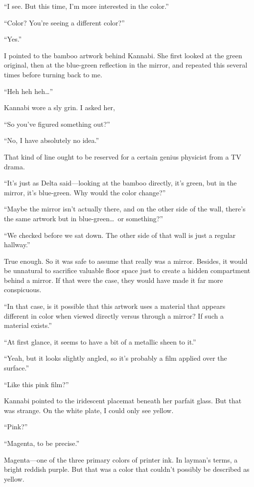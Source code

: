 \documentclass[
    a4paper,
    12pt,
    twoside,
    openany,
    UTF8,
    fontset=windows
]{ctexbook}
\begin{document}
``I see. But this time, I'm more interested in the color.''

``Color? You're seeing a different color?''

``Yes.''

I pointed to the bamboo artwork behind Kannabi. She first looked at the green original, then at the blue-green reflection in the mirror, and repeated this several times before turning back to me.

``Heh heh heh\dots''

Kannabi wore a sly grin. I asked her,

``So you've figured something out?''

``No, I have absolutely no idea.''

That kind of line ought to be reserved for a certain genius physicist from a TV drama.

``It's just as Delta said---looking at the bamboo directly, it's green, but in the mirror, it's blue-green. Why would the color change?''

``Maybe the mirror isn't actually there, and on the other side of the wall, there's the same artwork but in blue-green\dots\ or something?''

``We checked before we sat down. The other side of that wall is just a regular hallway.''

True enough. So it was safe to assume that really was a mirror. Besides, it would be unnatural to sacrifice valuable floor space just to create a hidden compartment behind a mirror. If that were the case, they would have made it far more conspicuous.

``In that case, is it possible that this artwork uses a material that appears different in color when viewed directly versus through a mirror? If such a material exists.''

``At first glance, it seems to have a bit of a metallic sheen to it.''

``Yeah, but it looks slightly angled, so it's probably a film applied over the surface.''

``Like this pink film?''

Kannabi pointed to the iridescent placemat beneath her parfait glass. But that was strange. On the white plate, I could only see yellow.

``Pink?''

``Magenta, to be precise.''

Magenta---one of the three primary colors of printer ink. In layman's terms, a bright reddish purple. But that was a color that couldn't possibly be described as yellow.
\end{document}
